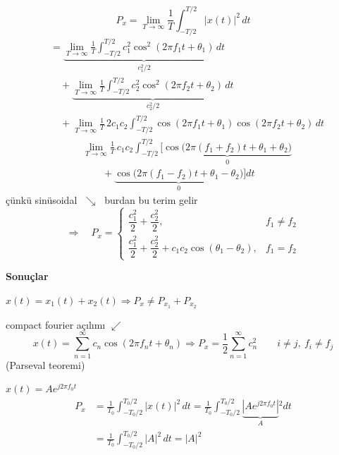 \documentclass[11pt,a4paper]{article}
\begin{document}
\[ P_x = \lim_{T\to\infty}\frac{1}{T}\int_{-T/2}^{T/2}|x(t)|^2\,dt \]
\begin{align*}
&= \underbrace{\lim_{T\to\infty}\frac{1}{T}\int_{-T/2}^{T/2}c_1^2\cos^2(2\pi f_1 t+\theta_1)\,dt}_{c_1^2/2} \\
&\quad + \underbrace{\lim_{T\to\infty}\frac{1}{T}\int_{-T/2}^{T/2}c_2^2\cos^2(2\pi f_2 t+\theta_2)\,dt}_{c_2^2/2} \\
&\quad + \lim_{T\to\infty}\frac{1}{T}\,2c_1c_2\int_{-T/2}^{T/2}\cos(2\pi f_1 t+\theta_1)\cos(2\pi f_2 t+\theta_2)\,dt
\end{align*}
\begin{align*}
&\lim_{T\to\infty}\frac{1}{T}\,c_1c_2\int_{-T/2}^{T/2}\Big[\underbrace{\cos\big(2\pi(f_1+f_2)t+\theta_1+\theta_2\big)}_{0} \\
&\qquad +\underbrace{\cos\big(2\pi(f_1-f_2)t+\theta_1-\theta_2\big)}_{0}\Big]dt
\end{align*}
\textcolor{kirmizikalem}{çünkü sinüsoidal} $\;\searrow\;$ \textcolor{murekkep}{burdan bu terim gelir}
\[ \Rightarrow\quad P_x=\begin{cases}
  \dfrac{c_1^2}{2}+\dfrac{c_2^2}{2}, & f_1\neq f_2 \\[3mm]
  \dfrac{c_1^2}{2}+\dfrac{c_2^2}{2}+c_1c_2\cos(\theta_1-\theta_2), & f_1=f_2
\end{cases} \]

\textbf{Sonuçlar}

$x(t)=x_1(t)+x_2(t) \Rightarrow P_x\neq P_{x_1}+P_{x_2}$

\hspace{3cm}compact fourier açılımı $\swarrow$
\[ x(t)=\sum_{n=1}^{\infty}c_n\cos(2\pi f_n t+\theta_n) \Rightarrow P_x=\frac{1}{2}\sum_{n=1}^{\infty}c_n^2 \qquad i\neq j,\ f_i\neq f_j \]
\hspace{6cm}(Parseval teoremi)

\begin{ornek}
  $x(t)=Ae^{j2\pi f_0 t}$
  \begin{align*}
    P_x &= \frac{1}{T_0}\int_{-T_0/2}^{T_0/2}|x(t)|^2\,dt = \frac{1}{T_0}\int_{-T_0/2}^{T_0/2}\underbrace{\left|Ae^{j2\pi f_0 t}\right|}_{A}{}^{2}dt \\
    &= \frac{1}{T_0}\int_{-T_0/2}^{T_0/2}|A|^2\,dt = |A|^2
  \end{align*}
\end{ornek}
\end{document}
